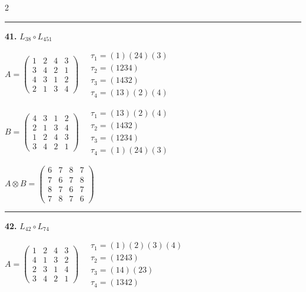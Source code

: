 \begin{multicols}{2}
\vspace{0.3em}
\hrule
\vspace{0.3em}

\noindent\textbf{41.} $L_{38} \circ L_{451}$

$A = \begin{pmatrix} 1 & 2 & 4 & 3 \\ 3 & 4 & 2 & 1 \\ 4 & 3 & 1 & 2 \\ 2 & 1 & 3 & 4 \end{pmatrix} \quad \begin{matrix} \tau_{1}=(1)(2 4)(3) \\ \tau_{2}=(1 2 3 4) \\ \tau_{3}=(1 4 3 2) \\ \tau_{4}=(1 3)(2)(4) \end{matrix}$

$B = \begin{pmatrix} 4 & 3 & 1 & 2 \\ 2 & 1 & 3 & 4 \\ 1 & 2 & 4 & 3 \\ 3 & 4 & 2 & 1 \end{pmatrix} \quad \begin{matrix} \tau_{1}=(1 3)(2)(4) \\ \tau_{2}=(1 4 3 2) \\ \tau_{3}=(1 2 3 4) \\ \tau_{4}=(1)(2 4)(3) \end{matrix}$

$A \otimes B = \begin{pmatrix} 6 & 7 & 8 & 7 \\ 7 & 6 & 7 & 8 \\ 8 & 7 & 6 & 7 \\ 7 & 8 & 7 & 6 \end{pmatrix}$

\vspace{0.3em}
\hrule
\vspace{0.3em}

\noindent\textbf{42.} $L_{42} \circ L_{74}$

$A = \begin{pmatrix} 1 & 2 & 4 & 3 \\ 4 & 1 & 3 & 2 \\ 2 & 3 & 1 & 4 \\ 3 & 4 & 2 & 1 \end{pmatrix} \quad \begin{matrix} \tau_{1}=(1)(2)(3)(4) \\ \tau_{2}=(1 2 4 3) \\ \tau_{3}=(1 4)(2 3) \\ \tau_{4}=(1 3 4 2) \end{matrix}$


\end{multicols}
